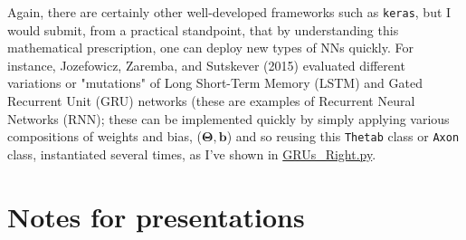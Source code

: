 \documentclass[10pt]{amsart}
\begin{document}
Again, there are certainly other well-developed frameworks such as \verb|keras|, but I would submit, from a practical standpoint, that by understanding this mathematical prescription, one can deploy new types of NNs quickly.  For instance, Jozefowicz, Zaremba, and Sutskever (2015)\cite{JZS2015} evaluated different variations or "mutations" of Long Short-Term Memory (LSTM) and Gated Recurrent Unit (GRU) networks (these are examples of Recurrent Neural Networks (RNN); these can be implemented quickly by simply applying various compositions of weights and bias, ($\mathbf{\Theta,b}$) and so reusing this \verb|Thetab| class or \verb|Axon| class, instantiated several times, as I've shown in \href{https://github.com/ernestyalumni/MLgrabbag/blob/master/ML/GRUs_Right.py}{GRUs_Right.py}.  

\section{Notes for presentations}  
\end{document}
